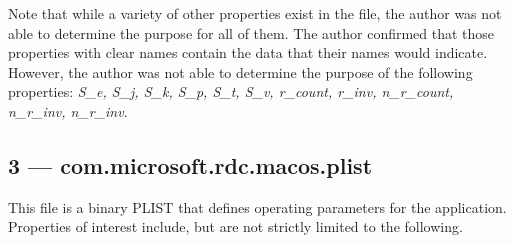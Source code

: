 \documentclass[journal]{IEEEtran}
\begin{document}
Note that while a variety of other properties exist in the file, the author was not able to determine the purpose for all of them. The author confirmed that those properties with clear names contain the data that their names would indicate. However, the author was not able to determine the purpose of the following properties: \textit{S\_e, S\_j, S\_k, S\_p, S\_t, S\_v, r\_count, r\_inv, n\_r\_count, n\_r\_inv, n\_r\_inv}.

\subsection{3 — com.microsoft.rdc.macos.plist}

This file is a binary PLIST that defines operating parameters for the application. Properties of interest include, but are not strictly limited to the following.
\end{document}
